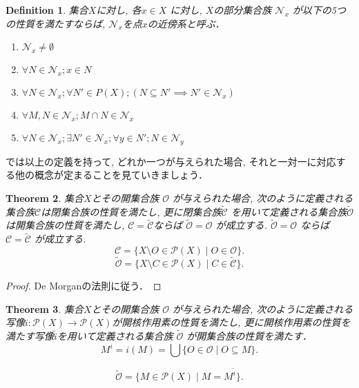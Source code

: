 \documentclass[lualatex]{ltjsbook}
\newtheorem{theorem}{Theorem}[chapter]
\newtheorem{definition}[theorem]{Definition}
\theoremstyle{remark}
\theoremstyle{plain}
\begin{document}
\begin{definition}
	集合$X$に対し,  各$x \in X$ に対し,  $X$の部分集合族 $\mathcal{N}_x$ が以下の5つの性質を満たすならば,  $\mathcal{N}_x$を点$x$の近傍系と呼ぶ．
	\begin{enumerate}
		\item $\mathcal{N}_x \neq \emptyset$
		\item $ \forall N \in \mathcal{N}_x; x \in N$
		\item $ \forall N \in \mathcal{N}_x; \forall N' \in P(X); \left( N \subseteq N' \implies N' \in \mathcal{N}_x \right) $ 
		\item $\forall M,  N \in \mathcal{N}_x ; M  \cap N \in \mathcal{N}_x $ 
		\item $\forall N \in \mathcal{N}_x; \exists N' \in \mathcal{N}_x ; \forall y \in N'; N \in \mathcal{N}_y$
	\end{enumerate}
\end{definition}
 \newpage
では以上の定義を持って,  どれか一つが与えられた場合,  それと一対一に対応する他の概念が定まることを見ていきましょう．

\begin{theorem}
集合$X$とその開集合族 $\mathcal{O}$ が与えられた場合,  
次のように定義される集合族$\mathcal{C}$は閉集合族の性質を満たし,  
更に閉集合族$\tilde{\mathcal{C}}$ を用いて定義される集合族$\tilde{\mathcal{O}}$は開集合族の性質を満たし, 
$\mathcal{C} = \tilde{\mathcal{C}}$ならば $\tilde{\mathcal{O}} = \mathcal{O}$  が成立する. $\tilde{\mathcal{O}} = \mathcal{O}$ ならば $\mathcal{C} = \tilde{\mathcal{C}}$ が成立する.
	 \[
	\mathcal{C} = \{X \setminus O \in \mathcal{P}(X) \mid O \in \mathcal{O} \} 
	.\] 
	\[
		\tilde{\mathcal{O}} = \{ X \setminus C \in \mathcal{P}(X)  \mid C \in \tilde{\mathcal{C}} \} 
	.\] 
\end{theorem}

\begin{proof}
	De Morganの法則に従う．	
\end{proof}

\begin{theorem}
	集合$X$とその開集合族 $\mathcal{O}$ が与えられた場合,  
	次のように定義される写像$i: \mathcal{P}(X) \to  \mathcal{P}(X)$が開核作用素の性質を満たし,  
	更に開核作用素の性質を満たす写像$\tilde{i}$を用いて定義される集合族 $\tilde{\mathcal{O}}$ が開集合族の性質を満たす．
	\[
	M^{i}= i(M) = \bigcup \{O \in \mathcal{O} \mid O \subseteq M\} 
	.\] 

	\[
		\tilde{\mathcal{O}} =\{ M \in \mathcal{P}(X) \mid M = M^{\tilde{i}}\} 
	.\] 
\end{theorem}
\end{document}
